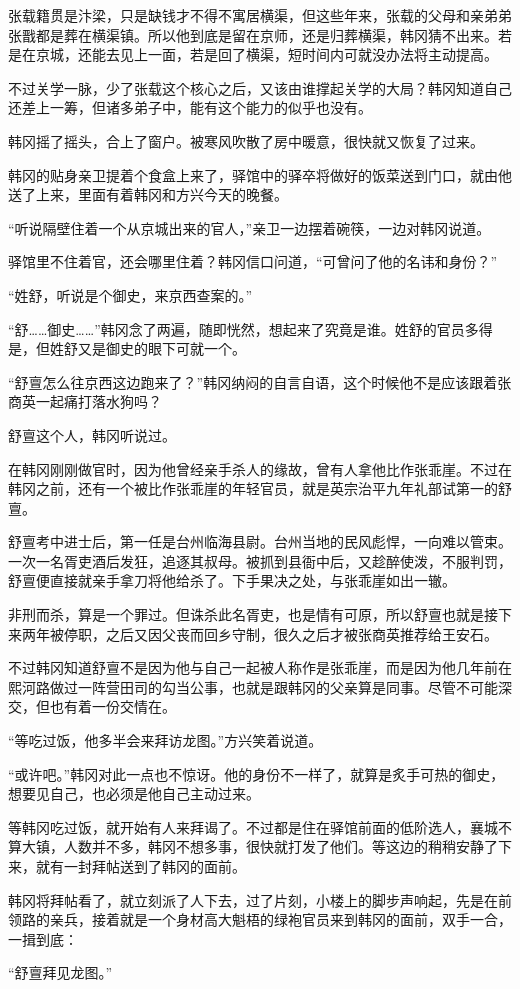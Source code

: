 张载籍贯是汴梁，只是缺钱才不得不寓居横渠，但这些年来，张载的父母和亲弟弟张戬都是葬在横渠镇。所以他到底是留在京师，还是归葬横渠，韩冈猜不出来。若是在京城，还能去见上一面，若是回了横渠，短时间内可就没办法将主动提高。

不过关学一脉，少了张载这个核心之后，又该由谁撑起关学的大局？韩冈知道自己还差上一筹，但诸多弟子中，能有这个能力的似乎也没有。

韩冈摇了摇头，合上了窗户。被寒风吹散了房中暖意，很快就又恢复了过来。

韩冈的贴身亲卫提着个食盒上来了，驿馆中的驿卒将做好的饭菜送到门口，就由他送了上来，里面有着韩冈和方兴今天的晚餐。

“听说隔壁住着一个从京城出来的官人，”亲卫一边摆着碗筷，一边对韩冈说道。

驿馆里不住着官，还会哪里住着？韩冈信口问道，“可曾问了他的名讳和身份？”

“姓舒，听说是个御史，来京西查案的。”

“舒……御史……”韩冈念了两遍，随即恍然，想起来了究竟是谁。姓舒的官员多得是，但姓舒又是御史的眼下可就一个。

“舒亶怎么往京西这边跑来了？”韩冈纳闷的自言自语，这个时候他不是应该跟着张商英一起痛打落水狗吗？

舒亶这个人，韩冈听说过。

在韩冈刚刚做官时，因为他曾经亲手杀人的缘故，曾有人拿他比作张乖崖。不过在韩冈之前，还有一个被比作张乖崖的年轻官员，就是英宗治平九年礼部试第一的舒亶。

舒亶考中进士后，第一任是台州临海县尉。台州当地的民风彪悍，一向难以管束。一次一名胥吏酒后发狂，追逐其叔母。被抓到县衙中后，又趁醉使泼，不服判罚，舒亶便直接就亲手拿刀将他给杀了。下手果决之处，与张乖崖如出一辙。

非刑而杀，算是一个罪过。但诛杀此名胥吏，也是情有可原，所以舒亶也就是接下来两年被停职，之后又因父丧而回乡守制，很久之后才被张商英推荐给王安石。

不过韩冈知道舒亶不是因为他与自己一起被人称作是张乖崖，而是因为他几年前在熙河路做过一阵营田司的勾当公事，也就是跟韩冈的父亲算是同事。尽管不可能深交，但也有着一份交情在。

“等吃过饭，他多半会来拜访龙图。”方兴笑着说道。

“或许吧。”韩冈对此一点也不惊讶。他的身份不一样了，就算是炙手可热的御史，想要见自己，也必须是他自己主动过来。

等韩冈吃过饭，就开始有人来拜谒了。不过都是住在驿馆前面的低阶选人，襄城不算大镇，人数并不多，韩冈不想多事，很快就打发了他们。等这边的稍稍安静了下来，就有一封拜帖送到了韩冈的面前。

韩冈将拜帖看了，就立刻派了人下去，过了片刻，小楼上的脚步声响起，先是在前领路的亲兵，接着就是一个身材高大魁梧的绿袍官员来到韩冈的面前，双手一合，一揖到底：

“舒亶拜见龙图。”

